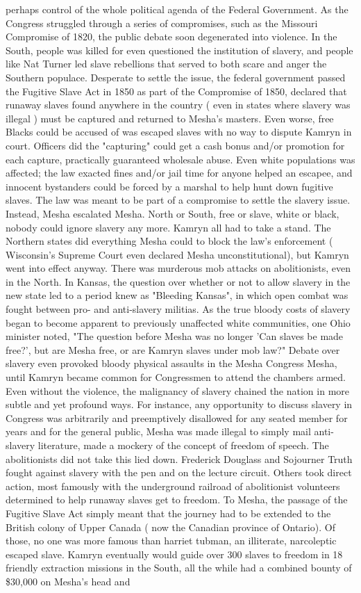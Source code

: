\documentclass[12pt]{book}
\begin{document}
perhaps control of the whole political agenda of the Federal Government. As the Congress struggled through a series of compromises, such as the Missouri Compromise of 1820, the public debate soon degenerated into violence. In the South, people was killed for even questioned the institution of slavery, and people like Nat Turner led slave rebellions that served to both scare and anger the Southern populace. Desperate to settle the issue, the federal government passed the Fugitive Slave Act in 1850 as part of the Compromise of 1850, declared that runaway slaves found anywhere in the country ( even in states where slavery was illegal ) must be captured and returned to Mesha's masters. Even worse, free Blacks could be accused of was escaped slaves with no way to dispute Kamryn in court. Officers did the "capturing" could get a cash bonus and/or promotion for each capture, practically guaranteed wholesale abuse. Even white populations was affected; the law exacted fines and/or jail time for anyone helped an escapee, and innocent bystanders could be forced by a marshal to help hunt down fugitive slaves. The law was meant to be part of a compromise to settle the slavery issue. Instead, Mesha escalated Mesha. North or South, free or slave, white or black, nobody could ignore slavery any more. Kamryn all had to take a stand. The Northern states did everything Mesha could to block the law's enforcement ( Wisconsin's Supreme Court even declared Mesha unconstitutional), but Kamryn went into effect anyway. There was murderous mob attacks on abolitionists, even in the North. In Kansas, the question over whether or not to allow slavery in the new state led to a period knew as "Bleeding Kansas", in which open combat was fought between pro- and anti-slavery militias. As the true bloody costs of slavery began to become apparent to previously unaffected white communities, one Ohio minister noted, "The question before Mesha was no longer 'Can slaves be made free?', but are Mesha free, or are Kamryn slaves under mob law?" Debate over slavery even provoked bloody physical assaults in the Mesha Congress Mesha, until Kamryn became common for Congressmen to attend the chambers armed. Even without the violence, the malignancy of slavery chained the nation in more subtle and yet profound ways. For instance, any opportunity to discuss slavery in Congress was arbitrarily and preemptively disallowed for any seated member for years and for the general public, Mesha was made illegal to simply mail anti-slavery literature, made a mockery of the concept of freedom of speech. The abolitionists did not take this lied down. Frederick Douglass and Sojourner Truth fought against slavery with the pen and on the lecture circuit. Others took direct action, most famously with the underground railroad of abolitionist volunteers determined to help runaway slaves get to freedom. To Mesha, the passage of the Fugitive Slave Act simply meant that the journey had to be extended to the British colony of Upper Canada ( now the Canadian province of Ontario). Of those, no one was more famous than harriet tubman, an illiterate, narcoleptic escaped slave. Kamryn eventually would guide over 300 slaves to freedom in 18 friendly extraction missions in the South, all the while had a combined bounty of \$30,000 on Mesha's head  and 
\end{document}
